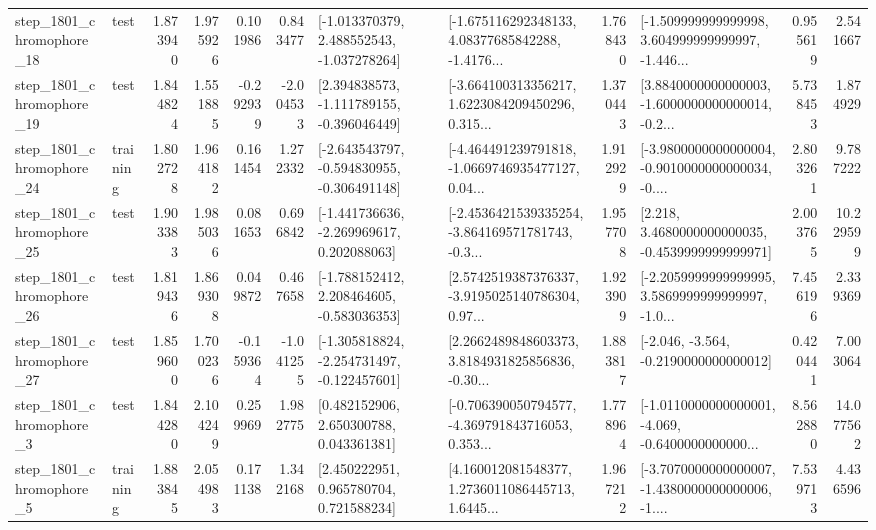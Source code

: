 \begin{tabular}{llrrrrllrlrr}
 step\_1801\_chromophore\_18 &      test &      1.873940 &    1.975926 &      0.101986 &  0.843477 &   [-1.013370379, 2.488552543, -1.037278264] &  [-1.675116292348133, 4.08377685842288, -1.4176... &       1.768430 &  [-1.509999999999998, 3.604999999999997, -1.446... &            0.955619 &          2.541667 \\
 step\_1801\_chromophore\_19 &      test &      1.844824 &    1.551885 &     -0.292939 & -2.004533 &   [2.394838573, -1.111789155, -0.396046449] &  [-3.664100313356217, 1.6223084209450296, 0.315... &       1.370443 &  [3.8840000000000003, -1.6000000000000014, -0.2... &            5.738453 &          1.874929 \\
 step\_1801\_chromophore\_24 &  training &      1.802728 &    1.964182 &      0.161454 &  1.272332 &  [-2.643543797, -0.594830955, -0.306491148] &  [-4.464491239791818, -1.0669746935477127, 0.04... &       1.912929 &  [-3.9800000000000004, -0.9010000000000034, -0.... &            2.803261 &          9.787222 \\
 step\_1801\_chromophore\_25 &      test &      1.903383 &    1.985036 &      0.081653 &  0.696842 &   [-1.441736636, -2.269969617, 0.202088063] &  [-2.4536421539335254, -3.864169571781743, -0.3... &       1.957708 &   [2.218, 3.4680000000000035, -0.4539999999999971] &            2.003765 &         10.229599 \\
 step\_1801\_chromophore\_26 &      test &      1.819436 &    1.869308 &      0.049872 &  0.467658 &   [-1.788152412, 2.208464605, -0.583036353] &  [2.5742519387376337, -3.9195025140786304, 0.97... &       1.923909 &  [-2.2059999999999995, 3.5869999999999997, -1.0... &            7.456196 &          2.339369 \\
 step\_1801\_chromophore\_27 &      test &      1.859600 &    1.700236 &     -0.159364 & -1.041255 &  [-1.305818824, -2.254731497, -0.122457601] &  [2.2662489848603373, 3.8184931825856836, -0.30... &       1.883817 &              [-2.046, -3.564, -0.2190000000000012] &            0.420441 &          7.003064 \\
  step\_1801\_chromophore\_3 &      test &      1.844280 &    2.104249 &      0.259969 &  1.982775 &     [0.482152906, 2.650300788, 0.043361381] &  [-0.706390050794577, -4.369791843716053, 0.353... &       1.778964 &  [-1.0110000000000001, -4.069, -0.6400000000000... &            8.562880 &         14.077562 \\
  step\_1801\_chromophore\_5 &  training &      1.883845 &    2.054983 &      0.171138 &  1.342168 &     [2.450222951, 0.965780704, 0.721588234] &  [4.160012081548377, 1.2736011086445713, 1.6445... &       1.967212 &  [-3.7070000000000007, -1.4380000000000006, -1.... &            7.539713 &          4.436596 \\

\end{tabular}
